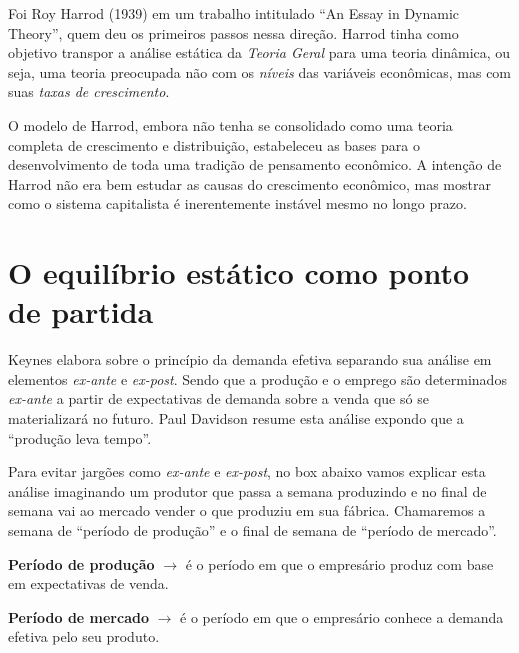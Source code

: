 \documentclass[
  brazilian,
  letterpaper,
  DIV=11,
  numbers=noendperiod]{scrreprt}
\begin{document}
Foi Roy Harrod (1939) em um trabalho intitulado ``An Essay in Dynamic
Theory'', quem deu os primeiros passos nessa direção. Harrod tinha como
objetivo transpor a análise estática da \emph{Teoria Geral} para uma
teoria dinâmica, ou seja, uma teoria preocupada não com os \emph{níveis}
das variáveis econômicas, mas com suas \emph{taxas de crescimento}.

O modelo de Harrod, embora não tenha se consolidado como uma teoria
completa de crescimento e distribuição, estabeleceu as bases para o
desenvolvimento de toda uma tradição de pensamento econômico. A intenção
de Harrod não era bem estudar as causas do crescimento econômico, mas
mostrar como o sistema capitalista é inerentemente instável mesmo no
longo prazo.

\section{O equilíbrio estático como ponto de
partida}\label{sec-estatico-harrod}

Keynes elabora sobre o princípio da demanda efetiva separando sua
análise em elementos \emph{ex-ante} e \emph{ex-post}. Sendo que a
produção e o emprego são determinados \emph{ex-ante} a partir de
expectativas de demanda sobre a venda que só se materializará no futuro.
Paul Davidson resume esta análise expondo que a ``produção leva tempo''.

Para evitar jargões como \emph{ex-ante} e \emph{ex-post}, no box abaixo
vamos explicar esta análise imaginando um produtor que passa a semana
produzindo e no final de semana vai ao mercado vender o que produziu em
sua fábrica. Chamaremos a semana de ``período de produção'' e o final de
semana de ``período de mercado''.

\begin{tcolorbox}[enhanced jigsaw, arc=.35mm, bottomrule=.15mm, bottomtitle=1mm, breakable, colback=white, colbacktitle=quarto-callout-important-color!10!white, colframe=quarto-callout-important-color-frame, coltitle=black, left=2mm, leftrule=.75mm, opacityback=0, opacitybacktitle=0.6, rightrule=.15mm, title=\textcolor{quarto-callout-important-color}{\faExclamation}\hspace{0.5em}{Importante}, titlerule=0mm, toprule=.15mm, toptitle=1mm]

\textbf{Período de produção} \(\rightarrow\) é o período em que o
empresário produz com base em expectativas de venda.

\textbf{Período de mercado} \(\rightarrow\) é o período em que o
empresário conhece a demanda efetiva pelo seu produto.

\end{tcolorbox}
\end{document}
